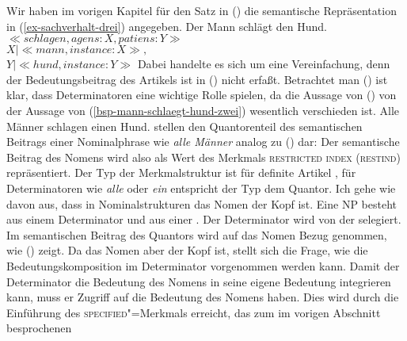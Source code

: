 Wir haben im vorigen Kapitel für den Satz in () die semantische
Repräsentation in (\ref{ex-sachverhalt-drei}) angegeben.
\ea
\label{bsp-mann-schlaegt-hund-zwei}
Der Mann schlägt den Hund.
\z
\ea
\label{ex-sachverhalt-drei}
$\ll schlagen, agens:X, patiens:Y\gg$\\
$X|\ll mann, instance:X\gg,$\\
$Y|\ll hund, instance:Y\gg$
\z
Dabei handelte es sich um eine Vereinfachung, denn der Bedeutungsbeitrag
des Artikels ist in () nicht erfaßt. Betrachtet man () ist klar,
dass Determinatoren eine wichtige Rolle spielen, da die Aussage von ()
von der Aussage von (\ref{bsp-mann-schlaegt-hund-zwei}) wesentlich verschieden ist.
\ea
Alle Männer schlagen einen Hund.
\z
\citet[]{ps2} stellen den Quantorenteil des semantischen Beitrags einer Nominalphrase wie \emph{alle Männer}
analog zu () dar:
\ea
{}
\z
Der semantische Beitrag des Nomens wird also als Wert des Merkmals \textsc{restricted index} (\textsc{restind})
repräsentiert. Der Typ der Merkmalstruktur ist für definite Artikel , für Determinatoren wie \emph{alle} 
oder \emph{ein} entspricht der Typ dem Quantor.
%
Ich gehe wie \citet[]{ps2} davon aus, dass in Nominalstrukturen das Nomen der Kopf ist. Eine NP besteht
aus einem Determinator und aus einer \nbar. Der Determinator wird von der \nbar selegiert.
Im semantischen Beitrag des Quantors wird auf das Nomen Bezug genommen, wie () zeigt. Da das
Nomen aber der Kopf ist, stellt sich die Frage, wie die Bedeutungskomposition im Determinator vorgenommen werden kann.
Damit der Determinator die Bedeutung des Nomens in seine eigene Bedeutung integrieren kann,
muss er Zugriff auf die Bedeutung des Nomens haben. Dies wird durch die Einführung des
\textsc{specified}"=Merkmals erreicht, das zum im vorigen Abschnitt besprochenen \modm
